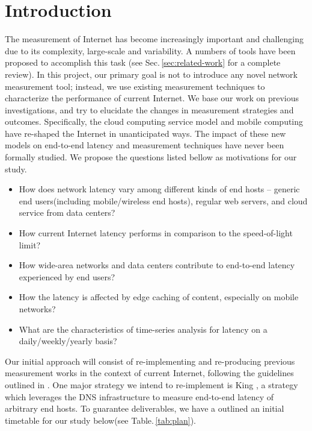 \section{Introduction}
\label{sec:introduction}

The measurement of Internet has become increasingly important and challenging due to its complexity, large-scale and variability. A numbers of tools have been proposed to accomplish this task (see Sec.\,\ref{sec:related-work} for a complete review). In this project, our primary goal is not to introduce any novel network measurement tool; instead, we use existing measurement techniques to characterize the performance of current Internet. We base our work on previous investigations, and try to elucidate the changes in measurement strategies and outcomes. Specifically, the cloud computing service model and mobile computing have re-shaped the Internet in unanticipated ways. The impact of these new models on end-to-end latency and measurement techniques have never been formally studied. We propose the questions listed bellow as motivations for our study.

\begin{itemize}
\item How does network latency vary among different kinds of end hosts -- generic end users(including mobile/wireless end hosts), regular web servers, and cloud service from data centers?
\item How current Internet latency performs in comparison to the speed-of-light limit?
\item How wide-area networks and data centers contribute to end-to-end latency experienced by end users?
\item How the latency is affected by edge caching of content, especially on mobile networks?
\item What are the characteristics of time-series analysis for latency on a daily/weekly/yearly basis?
\end{itemize}

Our initial approach will consist of re-implementing and re-producing previous measurement works in the context of current Internet, following the guidelines outlined in \cite{paxson2004strategies}. One major strategy we intend to re-implement is King \cite{gummadi2002king}, a strategy which leverages the DNS infrastructure to measure end-to-end latency of arbitrary end hosts. To guarantee deliverables, we have a outlined an initial timetable for our study below(see Table.\,\ref{tab:plan}).

